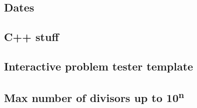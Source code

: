 \subsection{Dates}
\subsection{C++ stuff}
\subsection{Interactive problem tester template}
\subsection{Max number of divisors up to 10\textsuperscript{n}}


